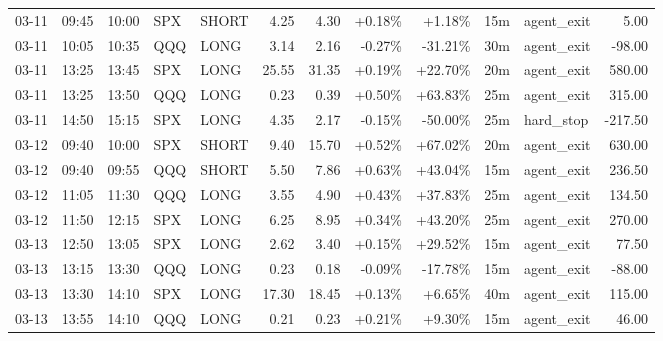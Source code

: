 \documentclass[11pt,a4paper]{article}
\begin{document}
\begin{center}
\begin{longtable}{>{\color{txtmain}}l l l l l r r r r r >{\color{txtmain}}l r}
03-11 & 09:45 & 10:00 & SPX & SHORT & 4.25 & 4.30 & \textcolor{wingreen}{+0.18\%} & \textcolor{wingreen}{+1.18\%} & 15m & agent\_exit & \textcolor{wingreen}{5.00} \\
03-11 & 10:05 & 10:35 & QQQ & LONG & 3.14 & 2.16 & \textcolor{lossred}{-0.27\%} & \textcolor{lossred}{-31.21\%} & 30m & agent\_exit & \textcolor{lossred}{-98.00} \\
03-11 & 13:25 & 13:45 & SPX & LONG & 25.55 & 31.35 & \textcolor{wingreen}{+0.19\%} & \textcolor{wingreen}{+22.70\%} & 20m & agent\_exit & \textcolor{wingreen}{580.00} \\
03-11 & 13:25 & 13:50 & QQQ & LONG & 0.23 & 0.39 & \textcolor{wingreen}{+0.50\%} & \textcolor{wingreen}{+63.83\%} & 25m & agent\_exit & \textcolor{wingreen}{315.00} \\
03-11 & 14:50 & 15:15 & SPX & LONG & 4.35 & 2.17 & \textcolor{lossred}{-0.15\%} & \textcolor{lossred}{-50.00\%} & 25m & hard\_stop & \textcolor{lossred}{-217.50} \\
03-12 & 09:40 & 10:00 & SPX & SHORT & 9.40 & 15.70 & \textcolor{wingreen}{+0.52\%} & \textcolor{wingreen}{+67.02\%} & 20m & agent\_exit & \textcolor{wingreen}{630.00} \\
03-12 & 09:40 & 09:55 & QQQ & SHORT & 5.50 & 7.86 & \textcolor{wingreen}{+0.63\%} & \textcolor{wingreen}{+43.04\%} & 15m & agent\_exit & \textcolor{wingreen}{236.50} \\
03-12 & 11:05 & 11:30 & QQQ & LONG & 3.55 & 4.90 & \textcolor{wingreen}{+0.43\%} & \textcolor{wingreen}{+37.83\%} & 25m & agent\_exit & \textcolor{wingreen}{134.50} \\
03-12 & 11:50 & 12:15 & SPX & LONG & 6.25 & 8.95 & \textcolor{wingreen}{+0.34\%} & \textcolor{wingreen}{+43.20\%} & 25m & agent\_exit & \textcolor{wingreen}{270.00} \\
03-13 & 12:50 & 13:05 & SPX & LONG & 2.62 & 3.40 & \textcolor{wingreen}{+0.15\%} & \textcolor{wingreen}{+29.52\%} & 15m & agent\_exit & \textcolor{wingreen}{77.50} \\
03-13 & 13:15 & 13:30 & QQQ & LONG & 0.23 & 0.18 & \textcolor{lossred}{-0.09\%} & \textcolor{lossred}{-17.78\%} & 15m & agent\_exit & \textcolor{lossred}{-88.00} \\
03-13 & 13:30 & 14:10 & SPX & LONG & 17.30 & 18.45 & \textcolor{wingreen}{+0.13\%} & \textcolor{wingreen}{+6.65\%} & 40m & agent\_exit & \textcolor{wingreen}{115.00} \\
03-13 & 13:55 & 14:10 & QQQ & LONG & 0.21 & 0.23 & \textcolor{wingreen}{+0.21\%} & \textcolor{wingreen}{+9.30\%} & 15m & agent\_exit & \textcolor{wingreen}{46.00} \\

\end{longtable}
\end{center}
\end{document}
